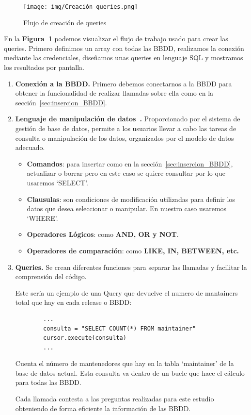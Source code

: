 \documentclass[a4paper, 12pt]{book}
\begin{document}
\begin{figure}
	\centering
	\texttt{[image: img/Creación queries.png]}
	\caption{Flujo de creación de queries}
	\label{fig:flujo creacion queries}
\end{figure}

En la \textbf{Figura~\ref{fig:flujo creacion queries}} podemos visualizar el flujo de trabajo usado para crear las queries. Primero definimos un array con todas las BBDD, realizamos la conexión mediante las credenciales, diseñamos unas queries en lenguaje SQL y mostramos los resultados por pantalla.
\begin{enumerate}
	\item \textbf{Conexión a la BBDD.} Primero debemos conectarnos a la BBDD para obtener la funcionalidad de realizar llamadas sobre ella como en la sección~\ref{sec:insercion_BBDD}.
	
	\item \textbf{Lenguaje de manipulación de datos~\cite{geotalleres:_sql}.} Proporcionado por el sistema de gestión de base de datos, permite a los usuarios llevar a cabo las tareas de consulta o manipulación de los datos, organizados por el modelo de datos adecuado. 

	\begin{itemize}
		\item \textbf{Comandos}: para insertar como en la sección~\ref{sec:insercion_BBDD}, actualizar o borrar pero en este caso se quiere consultar por lo que usaremos `SELECT'.
		
		\item \textbf{Clausulas}: son condiciones de modificación utilizadas para definir los datos que desea seleccionar o manipular. En nuestro caso usaremos `WHERE'.
		
		\item \textbf{Operadores Lógicos}: como \textbf{AND, OR y NOT}.
		
		\item \textbf{Operadores de comparación}: como \textbf{LIKE, IN, BETWEEN, etc.}
		
	\end{itemize}
	
	\item \textbf{Queries.} Se crean diferentes funciones para separar las llamadas y facilitar la comprensión del código. 
	
	
	
	Este sería un ejemplo de una Query que devuelve el numero de mantainers total que hay en cada release o BBDD:
	
	\begin{verbatim}
		...
		consulta = "SELECT COUNT(*) FROM maintainer"
		cursor.execute(consulta)
		...
	\end{verbatim} 
	
	Cuenta el número de mantenedores que hay en la tabla `maintainer' de la base de datos actual. Esta consulta va dentro de un bucle que hace el cálculo para todas las BBDD.
	
	Cada llamada contesta a las preguntas realizadas para este estudio obteniendo de forma eficiente la información de las BBDD.
	 
\end{enumerate}
\end{document}
